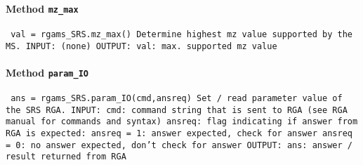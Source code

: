 \paragraph{Method \texttt{mz_max}}
\vspace{1ex}
\texttt{\newline
val = rgams_SRS.mz_max()\newline
\newline
Determine highest mz value supported by the MS.\newline
\newline
INPUT:\newline
(none)\newline
\newline
OUTPUT:\newline
val: max. supported mz value \newline
\newline
}

\paragraph{Method \texttt{param_IO}}
\vspace{1ex}
\texttt{\newline
ans = rgams_SRS.param_IO(cmd,ansreq)\newline
\newline
Set / read parameter value of the SRS RGA.\newline
\newline
INPUT:\newline
cmd: command string that is sent to RGA (see RGA manual for commands and syntax)\newline
ansreq: flag indicating if answer from RGA is expected:\newline
ansreq = 1: answer expected, check for answer\newline
ansreq = 0: no answer expected, don't check for answer\newline
\newline
OUTPUT:\newline
ans: answer / result returned from RGA\newline
\newline
}

